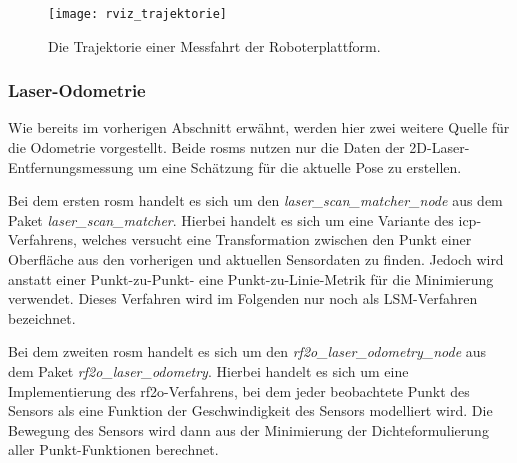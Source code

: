 \begin{figure}
	\centering
	\texttt{[image: rviz\_trajektorie]}
	\caption{Die Trajektorie einer Messfahrt der Roboterplattform.}
	\label{fig:rviz_trajektorie}
\end{figure}


%
%
\subsubsection{Laser-Odometrie}

Wie bereits im vorherigen Abschnitt erwähnt, werden hier zwei weitere Quelle für die Odometrie vorgestellt. Beide \Glspl{rosm} nutzen nur die Daten der 2D-Laser-Entfernungsmessung um eine Schätzung für die aktuelle Pose zu erstellen.

Bei dem ersten \gls{rosm} handelt es sich um den \textit{laser\_scan\_matcher\_node} aus dem Paket \textit{laser\_scan\_matcher}. Hierbei handelt es sich um eine Variante des \gls{icp}-Verfahrens, welches versucht eine Transformation zwischen den Punkt einer Oberfläche aus den vorherigen und aktuellen Sensordaten zu finden. Jedoch wird anstatt einer Punkt-zu-Punkt- eine Punkt-zu-Linie-Metrik für die Minimierung verwendet. \cite{censi2008icp} Dieses Verfahren wird im Folgenden nur noch als LSM-Verfahren bezeichnet.

Bei dem zweiten \gls{rosm} handelt es sich um den \textit{rf2o\_laser\_odometry\_node} aus dem Paket \textit{rf2o\_laser\_odometry}. Hierbei handelt es sich um eine Implementierung des \gls{rf2o}-Verfahrens, bei dem jeder beobachtete Punkt des Sensors als eine Funktion der Geschwindigkeit des Sensors modelliert wird. Die Bewegung des Sensors wird dann aus der Minimierung der Dichteformulierung aller Punkt-Funktionen berechnet. \cite{jaimez2016planar}


%
%
